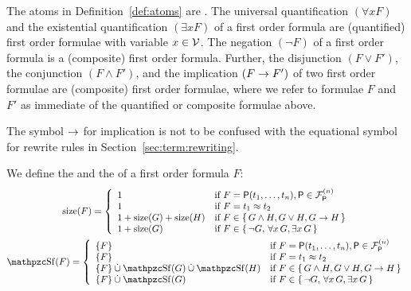 
\begin{definition}[\FOF]\label{def:syntax:FOF}
	The atoms in Definition~\vref{def:atoms} are .
	The universal quantification \( (\forall x F) \)
	and the existential quantification \( (\exists x F) \)
	of a first order formula are (quantified) first order formulae
	with  variable \( x\in\mathcal{V} \).
	The negation \( (\lnot F) \) of a first order formula
	is a (composite) first order formula.
	Further, the disjunction \( (F \lor F') \),
	the conjunction \( (F \land F')  \),
	and the implication \( (F \rightarrow F') \)
	of two first order formulae
	are (composite) first order formulae, where 
%
	we refer to formulae \(F \) and \( F' \)
	as immediate  of
	the quantified or composite formulae above.
\end{definition}

\begin{remark}
	The symbol \( \rightarrow \) for implication is not to be confused
	with the equational symbol for rewrite rules in Section~\ref{sec:term:rewriting}.
\end{remark}

\begin{definition}
	We define the  
	and the  of a first order formula \( F \):
\begin{gather*}
	\MDEFINE{\size(F)}{ll}{
		1
		&\text{if }F
		= \mP(t_1,\ldots,t_n), \mP\in\mcFPn
		\\
		1
		&\text{if }F
		= t_1\mEQ t_2
		\\
		1 + \size(G) + \size(H)&\text{if }F \in \{ \, G\land H,G \lor H,G\limp H \, \}
		\\
		1 + \size (G) &\text{if } F \in \{ \, \lnot G, \, \forall x \, G, \exists x \, G \, \}
	}
	\\
	\MDEFINE{\subformulae(F)}{ll}{
		\{ F \}
		&\text{if }F
		= \mP(t_1,\ldots,t_n), \mP\in\mcFPn
		\\
		\{ F \}
		&\text{if }F
		= t_1\mEQ t_2
		\\
		\{ F \} \disjointunion \subformulae(G) \disjointunion \subformulae(H)&\text{if }F \in \{ \, G\land H,G \lor H,G\limp H \, \}
		\\
		\{ F \} \disjointunion \subformulae(G) &\text{if } F \in \{ \, \lnot G, \, \forall x \, G, \exists x \, G \, \}
	}
\end{gather*}
\end{definition}

